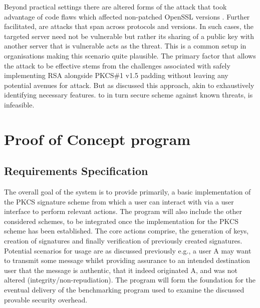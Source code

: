 \documentclass[]{final_report}
\theoremstyle{definition}
\begin{document}
Beyond practical settings there are altered forms of the attack that took advantage of code flaws which affected non-patched OpenSSL versions \cite{CVE-2006-4339}. Further facilitated, are attacks that span across protocols and versions. In such cases, the targeted server need not be vulnerable but rather its sharing of a public key with another server that is vulnerable acts as the threat. This is a common setup in organisations making this scenario quite plausible. The primary factor that allows the attack to be effective stems from the challenges associated with safely implementing RSA alongside PKCS\#1 v1.5 padding without leaving any potential avenues for attack. But as discussed this approach, akin to exhaustively identifying necessary features. to in turn secure scheme against known threats, is infeasible. 








\chapter{Proof of Concept program}
\section{Requirements Specification}
The overall goal of the system is to provide primarily, a basic implementation of the PKCS signature scheme from which a user can interact with via a user interface to perform relevant actions. The program will also include the other considered schemes, to be integrated once the implementation for the PKCS scheme has been established.
The core actions comprise, the generation of keys, creation of signatures and finally verification of previously created signatures. Potential scenarios for usage are as discussed previously e.g., a user A may want to transmit some message whilst providing assurance to an intended destination user that the message is authentic, that it indeed originated A, and was not altered (integrity/non-repudiation). 
The program will form the foundation for the eventual delivery of the benchmarking program used to examine the discussed provable security overhead.
\end{document}
